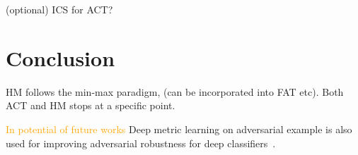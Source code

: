 \documentclass[10pt,twocolumn,letterpaper]{article}
\newcommand{\oo}[1]{\textcolor{orange}{#1}}
\begin{document}
(optional) ICS for ACT?

\section{Conclusion}
\label{sec:6}

HM follows the min-max paradigm, (can be incorporated into FAT etc).
Both ACT and HM stops at a specific point.

\oo{In potential of future works}
Deep metric learning on adversarial example is also used for improving
adversarial robustness for deep classifiers~\cite{mao2019metric}.

{\small


}


\end{document}
